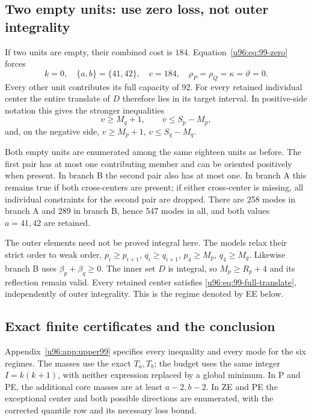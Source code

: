 \documentclass[11pt,a4paper]{article}
\theoremstyle{remark}
\begin{document}
\subsection{Two empty units: use zero loss, not outer integrality}
If two units are empty, their combined cost is $184$.
Equation~\eqref{u96:eq:99-zero} forces
\[
 k=0,\quad \{a,b\}=\{41,42\},\quad c=184,
 \quad \rho_P=\rho_Q=\kappa=\vartheta=0.
\]
Every other unit contributes its full capacity of 92. For every retained
individual center the entire translate of $D$ therefore lies in its target
interval. In positive-side notation this gives the stronger inequalities
\begin{equation}
 v\geq M_q+1,\qquad v\leq S_p-M_p,
 \label{u96:eq:99-full-translate}
\end{equation}
and, on the negative side, $v\geq M_p+1$, $v\leq S_q-M_q$.

Both empty units are enumerated among the same eighteen units as before.
The first pair has at most one contributing member and can be oriented
positively when present. In branch B the second pair also has at most one.
In branch A this remains true if both cross-centers are present; if either
cross-center is missing, all individual constraints for the second pair
are dropped. There are 258 modes in branch A and 289 in branch B, hence
547 modes in all, and both values $a=41,42$ are retained.

The outer elements need not be proved integral here. The models relax
their strict order to weak order, $p_i\geq p_{i+1}$,
$q_i\geq q_{i+1}$, $p_4\geq M_p$, $q_4\geq M_q$.
Likewise branch B uses $\beta_p+\beta_q\geq0$.
The inner set $D$ is integral, so $M_p\geq R_p+4$ and its reflection
remain valid. Every retained center satisfies
\eqref{u96:eq:99-full-translate}, independently of outer integrality.
This is the regime denoted by EE below.

\subsection{Exact finite certificates and the conclusion}
Appendix~\ref{u96:app:upper99} specifies every inequality and every mode for
the six regimes. The masses use the exact $T_a,T_b$; the budget uses the
same integer $I=k(k+1)$, with neither expression replaced by a global
minimum. In P and PE, the additional core masses are at least $a-2,b-2$.
In ZE and PE the exceptional center and both possible directions are
enumerated, with the corrected quantile row and its necessary loss bound.
\end{document}
